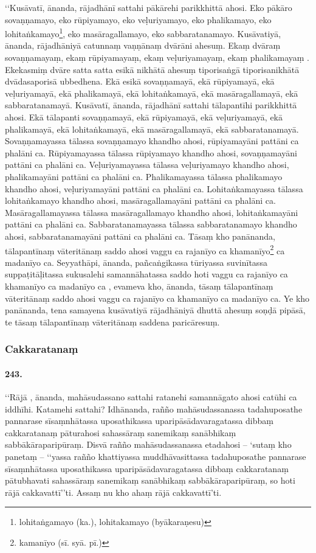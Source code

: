 ‘‘Kusāvatī, ānanda, rājadhānī sattahi pākārehi parikkhittā ahosi. Eko pākāro sovaṇṇamayo, eko rūpiyamayo, eko veḷuriyamayo, eko phalikamayo, eko lohitaṅkamayo\footnote{lohitaṅgamayo (ka.), lohitakamayo (byākaraṇesu)}, eko masāragallamayo, eko sabbaratanamayo. Kusāvatiyā, ānanda, rājadhāniyā catunnaṃ vaṇṇānaṃ dvārāni ahesuṃ. Ekaṃ dvāraṃ sovaṇṇamayaṃ, ekaṃ rūpiyamayaṃ, ekaṃ veḷuriyamayaṃ, ekaṃ phalikamayaṃ . Ekekasmiṃ dvāre satta satta esikā nikhātā ahesuṃ tiporisaṅgā tiporisanikhātā dvādasaporisā ubbedhena. Ekā esikā sovaṇṇamayā, ekā rūpiyamayā, ekā veḷuriyamayā, ekā phalikamayā, ekā lohitaṅkamayā, ekā masāragallamayā, ekā sabbaratanamayā. Kusāvatī, ānanda, rājadhānī sattahi tālapantīhi parikkhittā ahosi. Ekā tālapanti sovaṇṇamayā, ekā rūpiyamayā, ekā veḷuriyamayā, ekā phalikamayā, ekā lohitaṅkamayā, ekā masāragallamayā, ekā sabbaratanamayā. Sovaṇṇamayassa tālassa sovaṇṇamayo khandho ahosi, rūpiyamayāni pattāni ca phalāni ca. Rūpiyamayassa tālassa rūpiyamayo khandho ahosi, sovaṇṇamayāni pattāni ca phalāni ca. Veḷuriyamayassa tālassa veḷuriyamayo khandho ahosi, phalikamayāni pattāni ca phalāni ca. Phalikamayassa tālassa phalikamayo khandho ahosi, veḷuriyamayāni pattāni ca phalāni ca. Lohitaṅkamayassa tālassa lohitaṅkamayo khandho ahosi, masāragallamayāni pattāni ca phalāni ca. Masāragallamayassa tālassa masāragallamayo khandho ahosi, lohitaṅkamayāni pattāni ca phalāni ca. Sabbaratanamayassa tālassa sabbaratanamayo khandho ahosi, sabbaratanamayāni pattāni ca phalāni ca. Tāsaṃ kho panānanda, tālapantīnaṃ vāteritānaṃ saddo ahosi vaggu ca rajanīyo ca khamanīyo\footnote{kamanīyo (sī. syā. pī.)} ca madanīyo ca. Seyyathāpi, ānanda, pañcaṅgikassa tūriyassa suvinītassa suppaṭitāḷitassa sukusalehi samannāhatassa saddo hoti vaggu ca rajanīyo ca khamanīyo ca madanīyo ca , evameva kho, ānanda, tāsaṃ tālapantīnaṃ vāteritānaṃ saddo ahosi vaggu ca rajanīyo ca khamanīyo ca madanīyo ca. Ye kho panānanda, tena samayena kusāvatiyā rājadhāniyā dhuttā ahesuṃ soṇḍā pipāsā, te tāsaṃ tālapantīnaṃ vāteritānaṃ saddena paricāresuṃ.

\subsubsection{Cakkaratanaṃ}

\paragraph{243.} ‘‘Rājā , ānanda, mahāsudassano sattahi ratanehi samannāgato ahosi catūhi ca iddhīhi. Katamehi sattahi? Idhānanda, rañño mahāsudassanassa tadahuposathe pannarase sīsaṃnhātassa uposathikassa uparipāsādavaragatassa dibbaṃ cakkaratanaṃ pāturahosi sahassāraṃ sanemikaṃ sanābhikaṃ sabbākāraparipūraṃ. Disvā rañño mahāsudassanassa etadahosi – ‘sutaṃ kho panetaṃ – ‘‘yassa rañño khattiyassa muddhāvasittassa tadahuposathe pannarase sīsaṃnhātassa uposathikassa uparipāsādavaragatassa dibbaṃ cakkaratanaṃ pātubhavati sahassāraṃ sanemikaṃ sanābhikaṃ sabbākāraparipūraṃ, so hoti rājā cakkavattī’’ti. Assaṃ nu kho ahaṃ rājā cakkavattī’ti.

